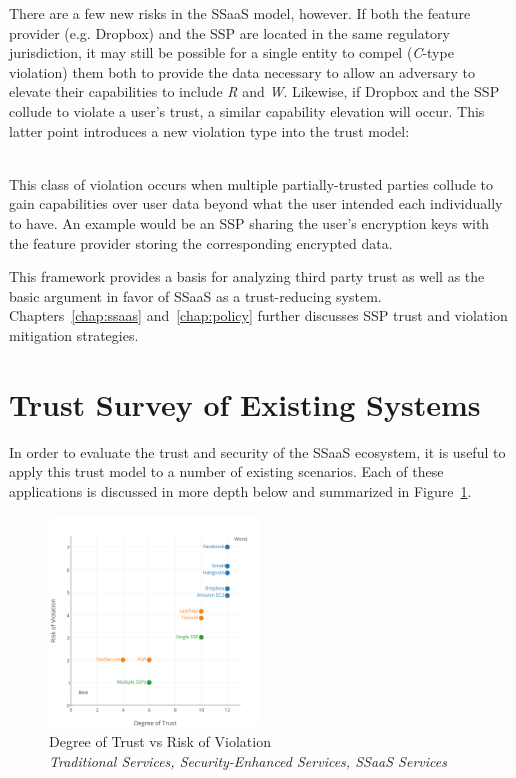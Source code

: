 There are a few new risks in the SSaaS model, however. If both the
feature provider (e.g. Dropbox) and the SSP are located in the same
regulatory jurisdiction, it may still be possible for a single entity
to compel (\emph{C}-type violation) them both to provide the data
necessary to allow an adversary to elevate their capabilities to
include \emph{R} and \emph{W}. Likewise, if Dropbox and the SSP
collude to violate a user's trust, a similar capability elevation will
occur. This latter point introduces a new violation type into the
trust model:

\begin{packed_desc}
\item[Colluding (L):] \hfill \\ This class of violation occurs when
  multiple partially-trusted parties collude to gain capabilities over
  user data beyond what the user intended each individually to
  have. An example would be an SSP sharing the user's encryption keys
  with the feature provider storing the corresponding encrypted data.
\end{packed_desc}

This framework provides a basis for analyzing third party trust as
well as the basic argument in favor of SSaaS as a trust-reducing
system. Chapters~\ref{chap:ssaas} and~\ref{chap:policy} further
discusses SSP trust and violation mitigation strategies.

\section{Trust Survey of Existing Systems}
\label{chap:trust:survey}

In order to evaluate the trust and security of the SSaaS ecosystem, it
is useful to apply this trust model to a number of existing
scenarios. Each of these applications is discussed in more depth below
and summarized in Figure~\ref{fig:trust:degvrisk}.

\begin{figure}[!t]
  \centering
  \includegraphics[width=0.5\textwidth]{./figs/pre/Trust-Chart-DegreeRisk-Traditional_Security_SSaaS.png}
  \caption{Degree of Trust vs Risk of Violation\\
    \textit{
      {\color{blue}Traditional Services},
      {\color{orange}Security-Enhanced Services},
      {\color{ForestGreen}SSaaS Services}}}
  \label{fig:trust:degvrisk}
\end{figure}


